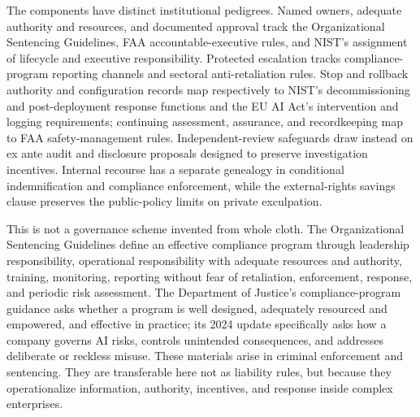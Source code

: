 The components have distinct institutional pedigrees. Named owners, adequate authority and resources, and documented approval track the Organizational Sentencing Guidelines, FAA accountable-executive rules, and NIST's assignment of lifecycle and executive responsibility. Protected escalation tracks compliance-program reporting channels and sectoral anti-retaliation rules. Stop and rollback authority and configuration records map respectively to NIST's decommissioning and post-deployment response functions and the EU AI Act's intervention and logging requirements; continuing assessment, assurance, and recordkeeping map to FAA safety-management rules. Independent-review safeguards draw instead on ex ante audit and disclosure proposals designed to preserve investigation incentives. Internal recourse has a separate genealogy in conditional indemnification and compliance enforcement, while the external-rights savings clause preserves the public-policy limits on private exculpation.

This is not a governance scheme invented from whole cloth. The Organizational Sentencing Guidelines define an effective compliance program through leadership responsibility, operational responsibility with adequate resources and authority, training, monitoring, reporting without fear of retaliation, enforcement, response, and periodic risk assessment. The Department of Justice's compliance-program guidance asks whether a program is well designed, adequately resourced and empowered, and effective in practice; its 2024 update specifically asks how a company governs AI risks, controls unintended consequences, and addresses deliberate or reckless misuse. These materials arise in criminal enforcement and sentencing. They are transferable here not as liability rules, but because they operationalize information, authority, incentives, and response inside complex enterprises.

